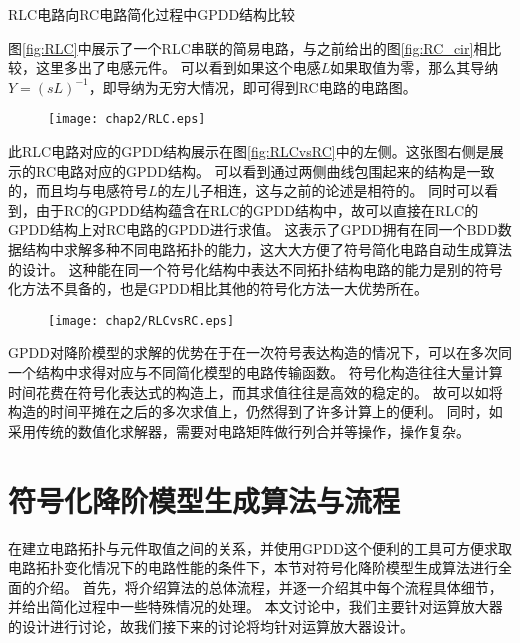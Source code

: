 \begin{exmp}
RLC电路向RC电路简化过程中GPDD结构比较

图\ref{fig:RLC}中展示了一个RLC串联的简易电路，与之前给出的图\ref{fig:RC_cir}相比较，这里多出了电感元件。
可以看到如果这个电感$L$如果取值为零，那么其导纳$Y=\left(s L\right)^{-1}$，即导纳为无穷大情况，即可得到RC电路的电路图。

\begin{figure}[!htp]
	\centering
	\texttt{[image: chap2/RLC.eps]}
\end{figure}

此RLC电路对应的GPDD结构展示在图\ref{fig:RLCvsRC}中的左侧。这张图右侧是展示的RC电路对应的GPDD结构。
可以看到通过两侧曲线包围起来的结构是一致的，而且均与电感符号$L$的左儿子相连，这与之前的论述是相符的。
同时可以看到，由于RC的GPDD结构蕴含在RLC的GPDD结构中，故可以直接在RLC的GPDD结构上对RC电路的GPDD进行求值。
这表示了GPDD拥有在同一个BDD数据结构中求解多种不同电路拓扑的能力，这大大方便了符号简化电路自动生成算法的设计。
这种能在同一个符号化结构中表达不同拓扑结构电路的能力是别的符号化方法不具备的，也是GPDD相比其他的符号化方法一大优势所在。

\begin{figure}[!htp]
	\centering
	\texttt{[image: chap2/RLCvsRC.eps]}
\end{figure}

\end{exmp}

GPDD对降阶模型的求解的优势在于在一次符号表达构造的情况下，可以在多次同一个结构中求得对应与不同简化模型的电路传输函数。
符号化构造往往大量计算时间花费在符号化表达式的构造上，而其求值往往是高效的稳定的。
故可以如将构造的时间平摊在之后的多次求值上，仍然得到了许多计算上的便利。
同时，如采用传统的数值化求解器，需要对电路矩阵做行列合并等操作，操作复杂。

\section{符号化降阶模型生成算法与流程}
\label{sec:simp:alg}

在建立电路拓扑与元件取值之间的关系，并使用GPDD这个便利的工具可方便求取电路拓扑变化情况下的电路性能的条件下，本节对符号化降阶模型生成算法进行全面的介绍。
首先，将介绍算法的总体流程，并逐一介绍其中每个流程具体细节，并给出简化过程中一些特殊情况的处理。
本文讨论中，我们主要针对运算放大器的设计进行讨论，故我们接下来的讨论将均针对运算放大器设计。

